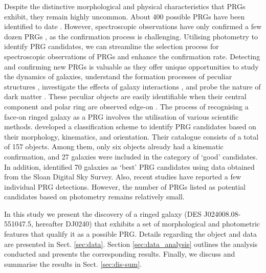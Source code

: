 \documentclass{aa}
\begin{document}
Despite the distinctive morphological and physical characteristics that PRGs exhibit, they remain highly uncommon. About 400 possible PRGs have been identified to date \citep{whitmore1990,moiseev2011MNRAS.418..244M,RM2019MNRAS.483.1470R}.  However, spectroscopic observations have only confirmed a  few dozen PRGs {\citep{whitmore1990,2011Reshetnikov_kin_conf}}, as the confirmation process is challenging. Utilising photometry to identify PRG candidates, we can streamline the selection process for spectroscopic observations of PRGs and enhance the confirmation rate. Detecting and confirming new PRGs is valuable as they offer unique opportunities to study the dynamics of galaxies, understand the formation processes of peculiar structures \citep{ordernes2016A&A...585A.156O}, investigate the effects of galaxy interactions {\citep{2004Combes_prg-inter}}, and probe the nature of dark matter \citep{2013Lghausenkroupa,2014Khoperskov}. These peculiar objects are easily identifiable when their central component and polar ring are observed edge-on \citep{2014Iodice,2022Nishimura}. The process of recognising a face-on ringed galaxy as a PRG involves the utilisation of various scientific methods. \cite{whitmore1990} developed a classification scheme to identify PRG candidates based on their morphology, kinematics, and orientation. Their catalogue consists of a total of 157 objects. Among them, only six objects already had a kinematic confirmation, and 27 galaxies were included in the category of `good' candidates. In addition, \citet{moiseev2011MNRAS.418..244M} identified 70 galaxies as `best' PRG candidates using data obtained from the Sloan Digital Sky Survey. Also, recent studies \citep{2011Finkelman,2022Nishimura} have reported a few individual PRG detections. However, the number of PRGs listed as potential candidates based on photometry remains relatively small. 

In this study we present the discovery of a ringed galaxy (DES J024008.08-551047.5, hereafter DJ0240) that exhibits a set of morphological and photometric features that qualify it as a possible PRG. Details regarding the object and data are presented in Sect. \ref{sec:data}. Section \ref{sec:data_analysis} outlines the analysis conducted and presents the corresponding results. Finally, we discuss and summarise the results in Sect. \ref{sec:dis-sum}. 
\end{document}
